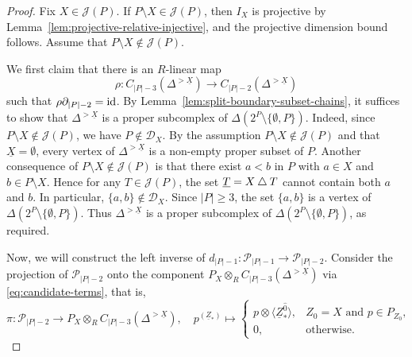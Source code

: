 \documentclass[a4paper,leqno]{amsart}
\begin{document}
\begin{proof}
Fix $X\in\mathcal J(P)$. If $P\setminus X\in\mathcal J(P)$, then $I_X$ is projective by Lemma~\ref{lem:projective-relative-injective}, and the projective dimension bound follows. Assume that $P\setminus X\notin\mathcal J(P)$.

\smallskip
\noindent
We first claim that there is an $R$-linear map
\[
\rho:
C_{|P|-3}(\Delta^{>\underline X})
\longrightarrow C_{|P|-2}(\Delta^{>\underline X})
\]
such that $\rho\partial_{|P|-2}=\operatorname{id}$.
By Lemma~\ref{lem:split-boundary-subset-chains}, it suffices to show that $\Delta^{>\underline X}$ is a proper subcomplex of $\Delta(2^P\setminus\{\emptyset,P\})$.  Indeed, since $P\setminus X\notin\mathcal J(P)$, we have $P\notin\mathcal D_X$. 
By the assumption $P\setminus X\notin \mathcal J(P)$ and that $\underline{X}=\emptyset$, every vertex of $\Delta^{>\underline X}$ is a non-empty proper subset of $P$. 
Another consequence of $P\setminus X\notin\mathcal J(P)$ is that there exist $a<b$ in $P$ with $a\in X$ and $b\in P\setminus X$. 
Hence for any $T\in\mathcal J(P)$, the set $\underline{T}=X\mathbin{\triangle} T$ cannot contain both $a$ and $b$. 
In particular,  $\{a,b\}\notin\mathcal D_X$.  Since $|P|\geq3$, the set $\{a,b\}$ is a vertex of $\Delta(2^P\setminus\{\emptyset,P\})$. Thus $\Delta^{>\underline X}$ is a proper subcomplex of $\Delta(2^P\setminus\{\emptyset,P\})$, as required.

Now, we will construct the left inverse of $d_{|P|-1}:\mathcal{P}_{|P|-1}\to \mathcal{P}_{|P|-2}$. 
Consider the projection of $\mathcal{P}_{|P|-2}$ onto the component $P_X\otimes_R C_{|P|-3}(\Delta^{> \underline{X}})$ via  \eqref{eq:candidate-terms}, that is,
\[
\pi:\mathcal P_{|P|-2}
\longrightarrow P_X\otimes_R C_{|P|-3}(\Delta^{>\underline X}), \quad p^{(\underline Z_\ast)}\mapsto \begin{cases}
p\otimes\langle\underline Z_*^{\widehat{0}}\rangle,
& Z_0=X \text{ and } p\in P_{Z_0},\\
0,& \text{otherwise}.
\end{cases}
\]


\end{proof}
\end{document}
